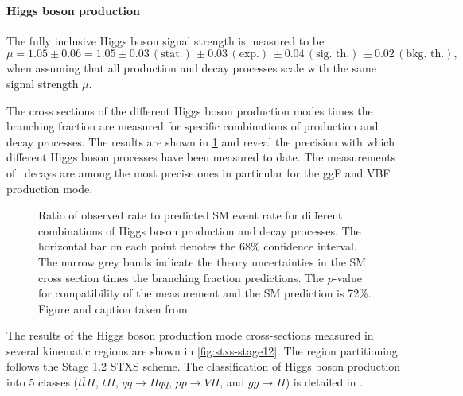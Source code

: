 \paragraph{Higgs boson production}
The fully inclusive Higgs boson signal strength is measured to be \cite{NaturePaper}
\begin{equation*}
   \mu =1.05 \pm 0.06 = 1.05\pm 0.03\, (\text{stat.})\, \pm 0.03\, (\text{exp.})\, \pm 0.04\, (\text{sig.\ th.})\, \pm 0.02\, (\text{bkg.\ th.}),
\end{equation*}
when assuming that all production and decay processes scale with the same signal strength $\mu$.

The cross sections of the different Higgs boson production modes times the branching fraction are measured for specific combinations of production and decay processes. 
The results are shown in \cref{fig:prod-per-channel} and reveal the precision with which different Higgs boson processes have been measured to date. 
The measurements of \HWW\ decays are among the most precise ones in particular for the ggF and VBF production mode.
\begin{figure}
  \caption{Ratio of observed rate to predicted SM event rate for different combinations of
  Higgs boson production and decay processes. The horizontal bar on each point denotes the 68\% confidence interval. The narrow grey bands indicate the theory uncertainties in the SM cross section times the branching
fraction predictions. The $p$-value for compatibility of the measurement and the SM prediction is
72\%. Figure and caption taken from .}
  \label{fig:prod-per-channel}
\end{figure}
The results of the Higgs boson production mode cross-sections measured in several kinematic regions are shown in \cref{fig:stxs-stage12}. The region partitioning follows the Stage 1.2 STXS scheme. 
The classification of Higgs boson production into 5 classes ($t\bar{t}H$, $tH$, $qq\to Hqq$, $pp\to VH$, and $gg\to H$) is detailed in . 
